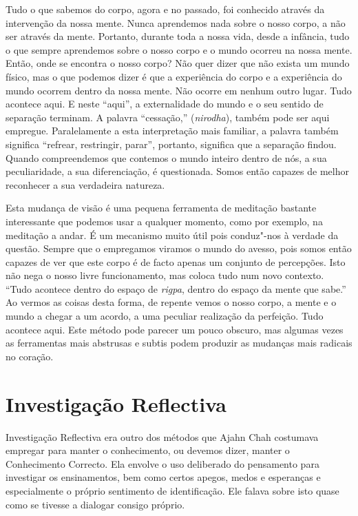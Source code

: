 Tudo o que sabemos do corpo, agora e no passado, foi conhecido através
da intervenção da nossa mente. Nunca aprendemos nada sobre o nosso
corpo, a não ser através da mente. Portanto, durante toda a nossa vida,
desde a infância, tudo o que sempre aprendemos sobre o nosso corpo e o
mundo ocorreu na nossa mente. Então, onde se encontra o nosso corpo? Não
quer dizer que não exista um mundo físico, mas o que podemos dizer é que
a experiência do corpo e a experiência do mundo ocorrem dentro da nossa
mente. Não ocorre em nenhum outro lugar. Tudo acontece aqui. E neste
``aqui'', a externalidade do mundo e o seu sentido de separação
terminam. A palavra ``cessação,'' (\emph{nirodha}), também pode ser aqui
empregue. Paralelamente a esta interpretação mais familiar, a palavra
também significa ``refrear, restringir, parar'', portanto, significa que
a separação findou. Quando compreendemos que contemos o mundo inteiro
dentro de nós, a sua peculiaridade, a sua diferenciação, é questionada.
Somos então capazes de melhor reconhecer a sua verdadeira natureza. 

Esta mudança de visão é uma pequena ferramenta de meditação bastante
interessante que podemos usar a qualquer momento, como por exemplo, na
meditação a andar. É um mecanismo muito útil pois conduz"-nos à verdade
da questão. Sempre que o empregamos viramos o mundo do avesso, pois
somos então capazes de ver que este corpo é de facto apenas um conjunto
de percepções. Isto não nega o nosso livre funcionamento, mas coloca
tudo num novo contexto. ``Tudo acontece dentro do espaço
de \emph{rigpa}, dentro do espaço da mente que sabe.'' Ao vermos as
coisas desta forma, de repente vemos o nosso corpo, a mente e o mundo a
chegar a um acordo, a uma peculiar realização da perfeição. Tudo
acontece aqui. Este método pode parecer um pouco obscuro, mas algumas
vezes as ferramentas mais abstrusas e subtis podem produzir as mudanças
mais radicais no coração.

\section{Investigação Reflectiva}

Investigação Reflectiva era outro dos métodos que Ajahn Chah costumava
empregar para manter o conhecimento, ou devemos dizer, manter o
Conhecimento Correcto. Ela envolve o uso deliberado do pensamento para
investigar os ensinamentos, bem como certos apegos, medos e esperanças
e especialmente o próprio sentimento de identificação. Ele falava sobre
isto quase como se tivesse a dialogar consigo próprio.

